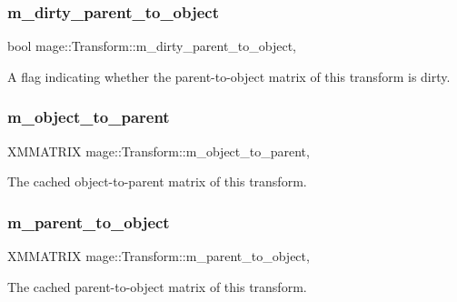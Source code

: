 \subsubsection{\texorpdfstring{m\+\_\+dirty\+\_\+parent\+\_\+to\+\_\+object}{m\_dirty\_parent\_to\_object}}
{\footnotesize\ttfamily bool mage\+::\+Transform\+::m\+\_\+dirty\+\_\+parent\+\_\+to\+\_\+object\hspace{0.3cm}{\ttfamily [mutable]}, {\ttfamily [private]}}

A flag indicating whether the parent-\/to-\/object matrix of this transform is dirty. \hypertarget{classmage_1_1_transform_ad21d0547b1648f22f6b28db044b1d4bd}{}\label{classmage_1_1_transform_ad21d0547b1648f22f6b28db044b1d4bd} 
\subsubsection{\texorpdfstring{m\+\_\+object\+\_\+to\+\_\+parent}{m\_object\_to\_parent}}
{\footnotesize\ttfamily X\+M\+M\+A\+T\+R\+IX mage\+::\+Transform\+::m\+\_\+object\+\_\+to\+\_\+parent\hspace{0.3cm}{\ttfamily [mutable]}, {\ttfamily [private]}}

The cached object-\/to-\/parent matrix of this transform. \hypertarget{classmage_1_1_transform_a4ca7fe2fe7ec7e09cda91e6af63f07f9}{}\label{classmage_1_1_transform_a4ca7fe2fe7ec7e09cda91e6af63f07f9} 
\subsubsection{\texorpdfstring{m\+\_\+parent\+\_\+to\+\_\+object}{m\_parent\_to\_object}}
{\footnotesize\ttfamily X\+M\+M\+A\+T\+R\+IX mage\+::\+Transform\+::m\+\_\+parent\+\_\+to\+\_\+object\hspace{0.3cm}{\ttfamily [mutable]}, {\ttfamily [private]}}

The cached parent-\/to-\/object matrix of this transform. \hypertarget{classmage_1_1_transform_a037b4fb338bfe79aa2ab1a2e809c40df}{}\label{classmage_1_1_transform_a037b4fb338bfe79aa2ab1a2e809c40df} 
